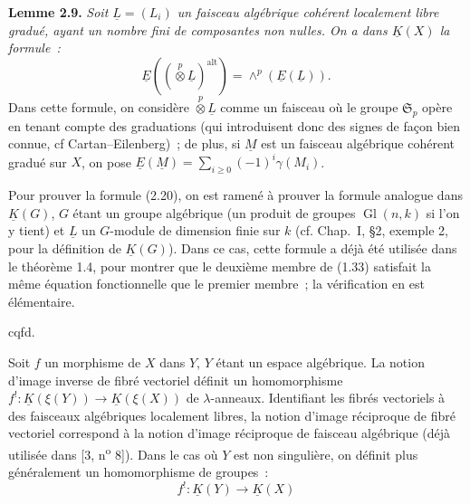 \textbf{Lemme 2.9.} \emph{Soit $\underline L=(L_i)$ un faisceau algébrique cohérent localement libre gradué, ayant un nombre fini de composantes non nulles. On a dans $\underline K(X)$ la formule~:}
\begin{equation}\tag{2.20}
 \underline E\left((\overset{p}{\otimes}\underline L)^{\mathrm{alt}}\right)=\wedge^p(\underline E(\underline L)).
\end{equation}
Dans cette formule, on considère $\overset{p}{\otimes}\underline L$ comme un faisceau où le groupe $\mathfrak S_p$ opère en tenant compte des graduations (qui introduisent donc des signes de façon bien connue, cf Cartan--Eilenberg)~; de plus, si $\underline M$ est un faisceau algébrique cohérent gradué sur $X$, on pose $\underline E(\underline M)=\sum_{i\geq0}(-1)^i\gamma(M_i)$.

Pour prouver la formule (2.20), on est ramené à prouver la formule analogue dans $\underline K(G)$, $G$ étant un groupe algébrique (un produit de groupes $\operatorname{Gl}(n,k)$ si l'on y tient) et $\underline L$ un $G$-module de dimension finie sur $k$ (cf. Chap.\ I, \S 2, exemple 2, pour la définition de $\underline K(G)$). Dans ce cas, cette formule a déjà été utilisée dans le théorème 1.4, pour montrer que le deuxième membre de (1.33) satisfait la même équation fonctionnelle que le premier membre~; la vérification en est élémentaire.
\begin{flushright}cqfd.\end{flushright}

Soit $f$ un morphisme de $X$ dans $Y$, $Y$ étant un espace algébrique. La notion d'image inverse de fibré vectoriel définit un homomorphisme $f^!:\underline K(\xi(Y))\longrightarrow\underline K(\xi(X))$ de $\lambda$-anneaux. Identifiant les fibrés vectoriels à des faisceaux algébriques localement libres, la notion d'image réciproque de fibré vectoriel correspond à la notion d'image réciproque de faisceau algébrique (déjà utilisée dans [3, n\textsuperscript{o} 8]). Dans le cas où $Y$ est non singulière, on définit plus généralement un homomorphisme de groupes~:
\begin{equation}\tag{2.21}
 f^!:\underline K(Y)\longrightarrow\underline K(X)
\end{equation}
